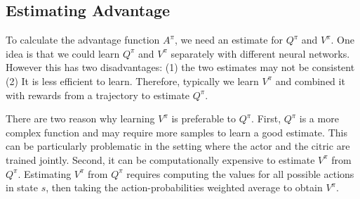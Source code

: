 \subsection{Estimating Advantage}
To calculate the advantage function $A^{\pi}$, we need an estimate for $Q^{\pi}$ and  $V^{\pi}$. One idea is that we could learn $Q^{\pi}$ and $V^{\pi}$ separately with different neural networks. However this has two disadvantages: (1) the two estimates may not be consistent (2) It is less efficient to learn. Therefore, typically we learn 
$V^{\pi}$ and combined it with rewards from a trajectory to estimate $Q^{\pi}$.

There are two reason why learning $V^{\pi}$ is preferable to $Q^{\pi}$. First, $Q^{\pi}$ is a more complex function and may require more samples to learn a good estimate. This can be particularly problematic in the setting where the actor and the citric are trained jointly. Second, it can be computationally expensive to estimate $V^{\pi}$ from $Q^{\pi}$. Estimating $V^{\pi}$ from $Q^{\pi}$ requires computing the values for all possible actions in state $s$, then taking the action-probabilities weighted average to obtain $V^{\pi}$.

